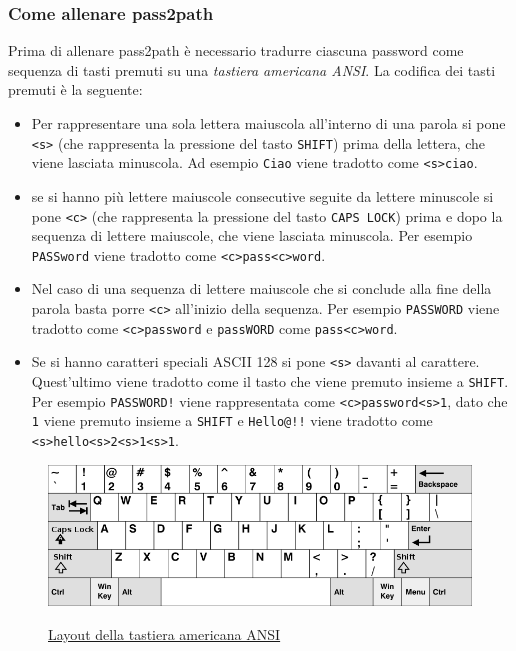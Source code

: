 \subsubsection{Come allenare pass2path}
Prima di allenare pass2path è necessario tradurre ciascuna password come sequenza di tasti premuti su una \emph{tastiera americana ANSI}. La codifica dei tasti premuti è la seguente:
\begin{itemize}
    \item Per rappresentare una sola lettera maiuscola all'interno di una parola si pone \texttt{<s>} (che rappresenta la pressione del tasto \texttt{SHIFT}) prima della lettera, che viene lasciata minuscola. Ad esempio \texttt{Ciao} viene tradotto come \texttt{<s>ciao}.
    \item se si hanno più lettere maiuscole consecutive seguite da lettere minuscole si pone \texttt{<c>} (che rappresenta la pressione del tasto \texttt{CAPS LOCK}) prima e dopo la sequenza di lettere maiuscole, che viene lasciata minuscola. Per esempio \texttt{PASSword} viene tradotto come \texttt{<c>pass<c>word}.
    \item Nel caso di una sequenza di lettere maiuscole che si conclude alla fine della parola basta porre \texttt{<c>} all'inizio della sequenza. Per esempio \texttt{PASSWORD} viene tradotto come \texttt{<c>password} e \texttt{passWORD} come \texttt{pass<c>word}.
    \item Se si hanno caratteri speciali ASCII 128 si pone \texttt{<s>} davanti al carattere.
    \\
    Quest'ultimo viene tradotto come il tasto che viene premuto insieme a \texttt{SHIFT}.
    Per esempio \texttt{PASSWORD!} viene rappresentata come \texttt{<c>password<s>1}, dato che \texttt{1} viene premuto insieme a \texttt{SHIFT} e \texttt{Hello@!!} viene tradotto come
    \\
    \texttt{<s>hello<s>2<s>1<s>1}.
\end{itemize}

\begin{figure}[h]
    \centering
    \includegraphics[width=15cm]{./immagini/US_keyboard_layout.png}
    \label{US layout}
    \caption{\href{https://upload.wikimedia.org/wikipedia/commons/thumb/5/51/KB_United_States-NoAltGr.svg/800px-KB_United_States-NoAltGr.svg.png}{Layout della tastiera americana ANSI}}
\end{figure}

